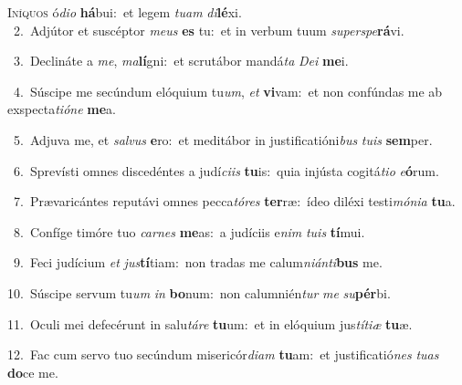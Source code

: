 \lettrine{\initial\textcolor{\initialcolor}{I}}{níquos} ó\-\textit{di}\-\textit{o} \textbf{há}\-bui:~\star et legem \textit{tu}\-\textit{am} \textit{di}\-\textbf{lé}xi.\\
{\numbfont\textcolor{\numbcolor}{~2.}}~Adjútor et suscéptor \textit{me}\-\textit{us} \textbf{es} tu:~\star et in verbum tuum \textit{su}\-\textit{per}\textit{spe}\textbf{rá}vi.\par
{\numbfont\textcolor{\numbcolor}{~3.}}~Declináte a \textit{me}\-, \textit{ma}\-\textbf{lí}gni:~\star et scrutábor mandá\textit{ta} \textit{De}\-\textit{i} \textbf{me}\-i.\par
{\numbfont\textcolor{\numbcolor}{~4.}}~Súscipe me secúndum elóquium tu\-\textit{um}\-, \textit{et} \textbf{vi}\-vam:~\star et non confúndas me ab exspecta\-\textit{ti}\-\textit{ó}\textit{ne} \textbf{me}\-a.\par
{\numbfont\textcolor{\numbcolor}{~5.}}~Adjuva me, et \textit{sal}\-\textit{vus} \textbf{e}\-ro:~\star et meditábor in justificatióni\textit{bus} \textit{tu}\-\textit{is} \textbf{sem}\-per.\par
{\numbfont\textcolor{\numbcolor}{~6.}}~Sprevísti omnes discedéntes a judí\-\textit{ci}\-\textit{is} \textbf{tu}\-is:~\star quia injústa cogitá\-\textit{ti}\-\textit{o} \textit{e}\-\textbf{ó}rum.\par
{\numbfont\textcolor{\numbcolor}{~7.}}~Prævaricántes reputávi omnes pecca\-\textit{tó}\-\textit{res} \textbf{ter}\-ræ:~\star ídeo diléxi testi\-\textit{mó}\-\textit{ni}\textit{a} \textbf{tu}\-a.\par
{\numbfont\textcolor{\numbcolor}{~8.}}~Confíge timóre tuo \textit{car}\-\textit{nes} \textbf{me}\-as:~\star a judíciis e\textit{nim} \textit{tu}\-\textit{is} \textbf{tí}\-mui.\par
{\numbfont\textcolor{\numbcolor}{~9.}}~Feci judícium \textit{et} \textit{jus}\-\textbf{tí}tiam:~\star non tradas me calum\-\textit{ni}\-\textit{án}\textit{ti}\textbf{bus} me.\par
{\numbfont\textcolor{\numbcolor}{10.}}~Súscipe servum tu\textit{um} \textit{in} \textbf{bo}\-num:~\star non calumnién\textit{tur} \textit{me} \textit{su}\-\textbf{pér}bi.\par
{\numbfont\textcolor{\numbcolor}{11.}}~Oculi mei defecérunt in salu\-\textit{tá}\-\textit{re} \textbf{tu}\-um:~\star et in elóquium jus\-\textit{tí}\-\textit{ti}\textit{æ} \textbf{tu}\-æ.\par
{\numbfont\textcolor{\numbcolor}{12.}}~Fac cum servo tuo secúndum misericór\-\textit{di}\-\textit{am} \textbf{tu}\-am:~\star et justificatió\textit{nes} \textit{tu}\-\textit{as} \textbf{do}\-ce me.\par
